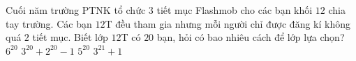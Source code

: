 \begin{ex}%
Cuối năm trường PTNK tổ chức $ 3  $ tiết mục Flashmob cho các bạn khối $ 12 $ chia tay trường. Các bạn $ 12 $T đều tham gia nhưng mỗi người chỉ được đăng kí không quá $ 2 $ tiết mục. Biết lớp $ 12 $T có $ 20 $ bạn, hỏi có bao nhiêu cách để lớp lựa chọn?	
	\choice
	{\True $ 6^{20} $}
	{$ 3^{20} + 2^{20} - 1 $}
	{$ 5^{20} $}
	{$ 3^{21} + 1 $}
\end{ex}	
